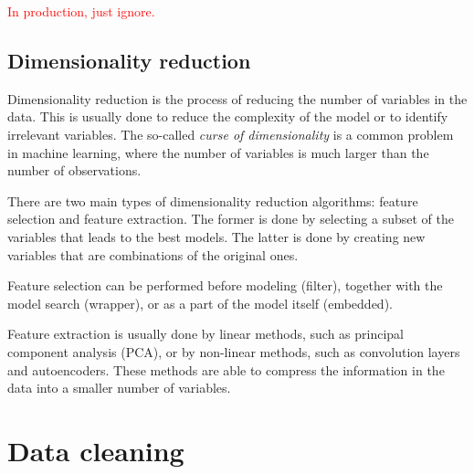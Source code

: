 \textcolor{red}{In production, just ignore.}

\subsection{Dimensionality reduction}

Dimensionality reduction is the process of reducing the number of variables in the data.
This is usually done to reduce the complexity of the model or to identify irrelevant
variables.  The so-called \emph{curse of dimensionality} is a common problem in machine
learning, where the number of variables is much larger than the number of observations.

There are two main types of dimensionality reduction algorithms: feature selection and
feature extraction.  The former is done by selecting a subset of the variables that leads
to the best models.  The latter is done by creating new variables that are combinations
of the original ones.

Feature selection can be performed before modeling (filter), together with the model
search (wrapper), or as a part of the model itself (embedded).

Feature extraction is usually done by linear methods, such as principal component analysis
(PCA), or by non-linear methods, such as convolution layers and autoencoders.  These methods are able to
compress the information in the data into a smaller number of variables.



\section{Data cleaning}

